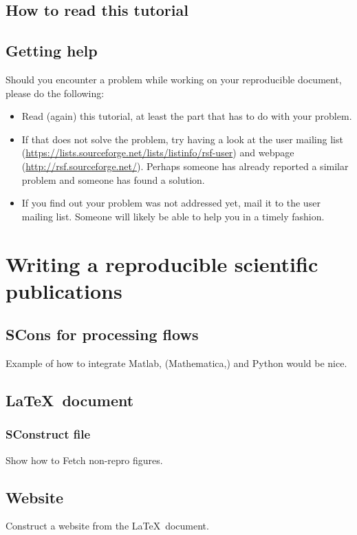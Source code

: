 \subsection{How to read this tutorial}


\subsection{Getting help}

Should you encounter a problem while working on your \rsf reproducible
document, please do the following:

\begin{itemize}
\item Read (again) this tutorial, at least the part that has to do
  with your problem.
\item If that does not solve the problem, try having a look at the
  \rsf user mailing list
  (\url{https://lists.sourceforge.net/lists/listinfo/rsf-user}) and
  \rsf webpage (\url{http://rsf.sourceforge.net/}). Perhaps someone
  has already reported a similar problem and someone has found a
  solution.
\item If you find out your problem was not addressed yet, mail it to
  the \rsf user mailing list. Someone will likely be able to help you
  in a timely fashion.
\end{itemize}

\section{Writing a reproducible scientific publications}
\subsection{SCons for processing flows}

Example of how to integrate Matlab, (Mathematica,) and Python would be
nice.

\subsection{\LaTeX\ document}
\subsubsection{SConstruct file}
Show how to Fetch non-repro figures.

\subsection{Website}

Construct a website from the \LaTeX\ document.

